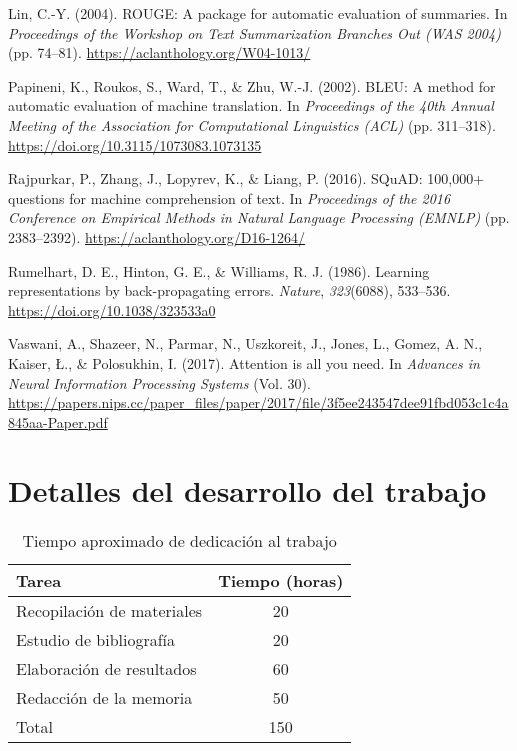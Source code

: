 \documentclass[12pt,twoside]{article}
\begin{document}
\begin{thebibliography}{100}
 Lin, C.-Y. (2004). ROUGE: A package for automatic evaluation of summaries. In \textit{Proceedings of the Workshop on Text Summarization Branches Out (WAS 2004)} (pp. 74--81). \url{https://aclanthology.org/W04-1013/}

 Papineni, K., Roukos, S., Ward, T., \& Zhu, W.-J. (2002). BLEU: A method for automatic evaluation of machine translation. In \textit{Proceedings of the 40th Annual Meeting of the Association for Computational Linguistics (ACL)} (pp. 311--318). \url{https://doi.org/10.3115/1073083.1073135}

 Rajpurkar, P., Zhang, J., Lopyrev, K., \& Liang, P. (2016). SQuAD: 100,000+ questions for machine comprehension of text. In \textit{Proceedings of the 2016 Conference on Empirical Methods in Natural Language Processing (EMNLP)} (pp. 2383--2392). \url{https://aclanthology.org/D16-1264/}

 Rumelhart, D. E., Hinton, G. E., \& Williams, R. J. (1986). Learning representations by back-propagating errors. \textit{Nature}, \textit{323}(6088), 533--536. \url{https://doi.org/10.1038/323533a0}

 Vaswani, A., Shazeer, N., Parmar, N., Uszkoreit, J., Jones, L., Gomez, A. N., Kaiser, Ł., \& Polosukhin, I. (2017). Attention is all you need. In \textit{Advances in Neural Information Processing Systems} (Vol. 30). \url{https://papers.nips.cc/paper_files/paper/2017/file/3f5ee243547dee91fbd053c1c4a845aa-Paper.pdf}





\end{thebibliography}


\newpage
\appendix

\section{Detalles del desarrollo del trabajo}

\begin{table}[H]
    \centering
    \begin{tabular}{l c}
        \hline
        Tarea & Tiempo (horas) \\
        \hline
        Recopilación de materiales & 20 \\
        Estudio de bibliografía & 20 \\
        Elaboración de resultados & 60 \\
        Redacción de la memoria & 50 \\
        \hline
        Total & 150 \\
        \hline
    \end{tabular}
    \caption{Tiempo aproximado de dedicación al trabajo}
    \label{tab:tiempo}
\end{table}
\end{document}
